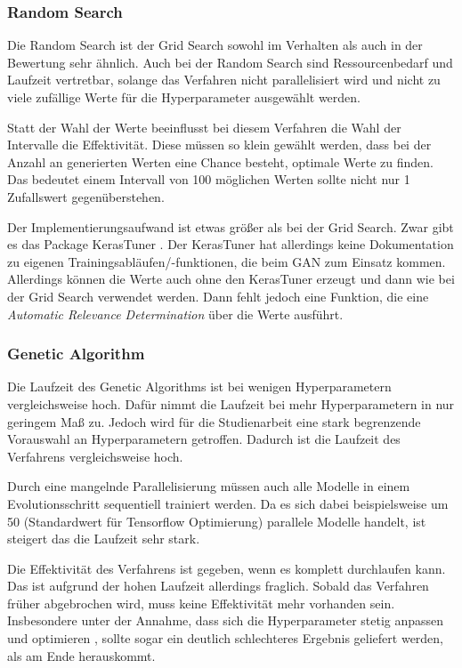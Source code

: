 \subsubsection{Random Search}
Die Random Search ist der Grid Search sowohl im Verhalten als auch in der Bewertung sehr ähnlich.
Auch bei der Random Search sind Ressourcenbedarf und Laufzeit vertretbar, solange das Verfahren nicht parallelisiert wird und nicht zu viele zufällige Werte für die Hyperparameter ausgewählt werden.
\newline

Statt der Wahl der Werte beeinflusst bei diesem Verfahren die Wahl der Intervalle die Effektivität.
Diese müssen so klein gewählt werden, dass bei der Anzahl an generierten Werten eine Chance besteht, optimale Werte zu finden.
Das bedeutet einem Intervall von 100 möglichen Werten sollte nicht nur 1 Zufallswert gegenüberstehen. 
\newline

Der Implementierungsaufwand ist etwas größer als bei der Grid Search.
Zwar gibt es das Package KerasTuner \cite{omalley2019kerastuner}.
Der KerasTuner hat allerdings keine Dokumentation zu eigenen Trainingsabläufen/-funktionen, die beim GAN zum Einsatz kommen.
Allerdings können die Werte auch ohne den KerasTuner erzeugt und dann wie bei der Grid Search verwendet werden.
Dann fehlt jedoch eine Funktion, die eine \textit{Automatic Relevance Determination} über die Werte ausführt.

\subsubsection{Genetic Algorithm}
Die Laufzeit des Genetic Algorithms ist bei wenigen Hyperparametern vergleichsweise hoch.
Dafür nimmt die Laufzeit bei mehr Hyperparametern in nur geringem Maß zu.
Jedoch wird für die Studienarbeit eine stark begrenzende Vorauswahl an Hyperparametern getroffen. 
Dadurch ist die Laufzeit des Verfahrens vergleichsweise hoch.

Durch eine mangelnde Parallelisierung müssen auch alle Modelle in einem Evolutionsschritt sequentiell trainiert werden.
Da es sich dabei beispielsweise um 50 (Standardwert für Tensorflow Optimierung) parallele Modelle handelt, ist steigert das die Laufzeit sehr stark.
\newline

Die Effektivität des Verfahrens ist gegeben, wenn es komplett durchlaufen kann.
Das ist aufgrund der hohen Laufzeit allerdings fraglich.
Sobald das Verfahren früher abgebrochen wird, muss keine Effektivität mehr vorhanden sein.
Insbesondere unter der Annahme, dass sich die Hyperparameter stetig anpassen und optimieren , sollte sogar ein deutlich schlechteres Ergebnis geliefert werden, als am Ende herauskommt.
\newline

